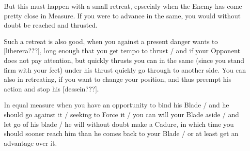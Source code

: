 \newpage


\newpage


But this must happen with a small retreat, epsecialy when the Enemy
has come pretty close in Measure. If you were to advance in the same,
you would without doubt be reached and thrusted.


Such a retreat is also good, when you against a present danger wants
to [liberera???], long enough that you get tempo to
thrust / and if your Opponent does not pay attention, but quickly
thrusts you can in the same (since you stand firm with your feet)
under his thrust quickly go through to another side. You can also in
retreating, if you want to change your position, and thus preempt his
action and stop his [dessein???].


In equal measure when you have an opportunity to bind his Blade / and
he should go against it / seeking to Force it / you can will your
Blade aside / and let go of his blade / he will without doubt make a
Cadure, in which time you should sooner reach him than he comes back
to your Blade / or at least get an advantage over it.


